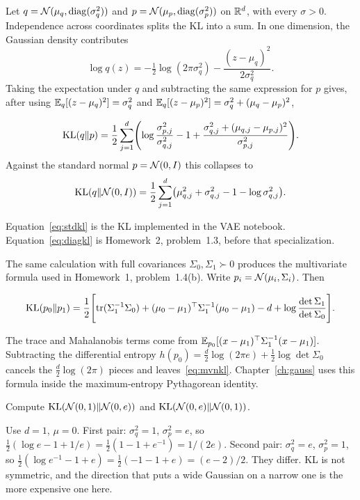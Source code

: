 Let $q=\mathcal{N}(\mu_q,\operatorname{diag}(\sigma_q^2))$ and $p=\mathcal{N}(\mu_p,\operatorname{diag}(\sigma_p^2))$ on $\mathbb{R}^d$, with every $\sigma>0$. Independence across coordinates splits the KL into a sum. In one dimension, the Gaussian density contributes
\[
\log q(z)=-\tfrac12\log(2\pi\sigma_q^2)-\frac{(z-\mu_q)^2}{2\sigma_q^2}.
\]
Taking the expectation under $q$ and subtracting the same expression for $p$ gives, after using $\mathbb{E}_q[(z-\mu_q)^2]=\sigma_q^2$ and $\mathbb{E}_q[(z-\mu_p)^2]=\sigma_q^2+(\mu_q-\mu_p)^2$,
\begin{resultbox}
\begin{equation}
\label{eq:diagkl}
\mathrm{KL}(q\Vert p)=\frac12\sum_{j=1}^{d}
\Biggl(
\log\frac{\sigma_{p,j}^2}{\sigma_{q,j}^2}
-1
+\frac{\sigma_{q,j}^2+(\mu_{q,j}-\mu_{p,j})^2}{\sigma_{p,j}^2}
\Biggr).
\end{equation}
Against the standard normal $p=\mathcal{N}(0,I)$ this collapses to
\begin{equation}
\label{eq:stdkl}
\mathrm{KL}(q\Vert \mathcal{N}(0,I))=\frac12\sum_{j=1}^{d}\bigl(\mu_{q,j}^2+\sigma_{q,j}^2-1-\log\sigma_{q,j}^2\bigr).
\end{equation}
\end{resultbox}

Equation~\eqref{eq:stdkl} is the KL implemented in the VAE notebook. Equation~\eqref{eq:diagkl} is Homework~2, problem~1.3, before that specialization.

The same calculation with full covariances $\Sigma_0,\Sigma_1\succ 0$ produces the multivariate formula used in Homework~1, problem~1.4(b). Write $p_i=\mathcal{N}(\mu_i,\Sigma_i)$. Then
\begin{resultbox}
\label{res:mvnkl}
\begin{equation}
\label{eq:mvnkl}
\mathrm{KL}(p_0\Vert p_1)
=\frac12\Biggl[
\operatorname{tr}(\Sigma_1^{-1}\Sigma_0)
+(\mu_0-\mu_1)^\top\Sigma_1^{-1}(\mu_0-\mu_1)
-d
+\log\frac{\det\Sigma_1}{\det\Sigma_0}
\Biggr].
\end{equation}
\end{resultbox}
The trace and Mahalanobis terms come from $\mathbb{E}_{p_0}[(x-\mu_1)^\top\Sigma_1^{-1}(x-\mu_1)]$. Subtracting the differential entropy $h(p_0)=\tfrac d2\log(2\pi e)+\tfrac12\log\det\Sigma_0$ cancels the $\tfrac d2\log(2\pi)$ pieces and leaves~\eqref{eq:mvnkl}. Chapter~\ref{ch:gauss} uses this formula inside the maximum-entropy Pythagorean identity.

\begin{practbox}
Compute $\mathrm{KL}(\mathcal{N}(0,1)\Vert \mathcal{N}(0,e))$ and $\mathrm{KL}(\mathcal{N}(0,e)\Vert \mathcal{N}(0,1))$.
\end{practbox}
\begin{solbox}
Use $d=1$, $\mu=0$. First pair: $\sigma_q^2=1$, $\sigma_p^2=e$, so
$\tfrac12(\log e-1+1/e)=\tfrac12(1-1+e^{-1})=1/(2e)$.
Second pair: $\sigma_q^2=e$, $\sigma_p^2=1$, so
$\tfrac12(\log e^{-1}-1+e)=\tfrac12(-1-1+e)=(e-2)/2$.
They differ. KL is not symmetric, and the direction that puts a wide Gaussian on a narrow one is the more expensive one here.
\end{solbox}


